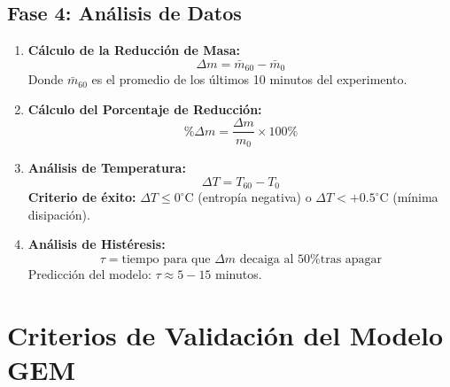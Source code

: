 \documentclass[12pt, a4paper]{article}
\begin{document}
\subsection{Fase 4: Análisis de Datos}

\begin{enumerate}[label=\textbf{Paso \arabic*:}, leftmargin=*, start=10]
    \item \textbf{Cálculo de la Reducción de Masa:}
    \begin{equation}
    \Delta m = \bar{m}_{60} - \bar{m}_0
    \end{equation}
    Donde $\bar{m}_{60}$ es el promedio de los últimos 10 minutos del experimento.
    
    \item \textbf{Cálculo del Porcentaje de Reducción:}
    \begin{equation}
    \% \Delta m = \frac{\Delta m}{m_0} \times 100\%
    \end{equation}
    
    \item \textbf{Análisis de Temperatura:}
    \begin{equation}
    \Delta T = T_{60} - T_0
    \end{equation}
    \textbf{Criterio de éxito:} $\Delta T \leq 0^\circ$C (entropía negativa) o $\Delta T < +0.5^\circ$C (mínima disipación).
    
    \item \textbf{Análisis de Histéresis:}
    \begin{equation}
    \tau = \text{tiempo para que } \Delta m \text{ decaiga al 50\% tras apagar}
    \end{equation}
    Predicción del modelo: $\tau \approx 5-15$ minutos.
\end{enumerate}

\section{Criterios de Validación del Modelo GEM}
\end{document}
